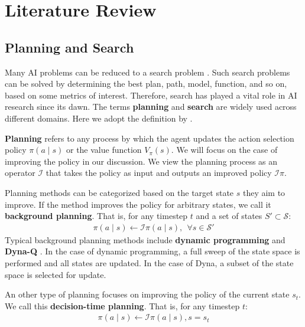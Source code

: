 \chapter{Literature Review} \label{sec:literature}

\section{Planning and Search}
Many AI problems can be reduced to a search problem \cite[p.39]{ArtificialIntelligenceGames_Yannakakis.Togelius_2018}.
Such search problems can be solved by determining the best plan, path, model, function, and so on, based on some metrics of interest.
Therefore, search has played a vital role in AI research since its dawn. The terms \textbf{planning} and \textbf{search} are widely used across different domains.
Here we adopt the definition by \citeauthor{ReinforcementLearningIntroduction_Sutton.Barto_2018} \cite{ReinforcementLearningIntroduction_Sutton.Barto_2018}.

\textbf{Planning} refers to any process by which the agent updates the action selection policy $\pi(a \mid s)$ or the value function $V_\pi(s)$.
We will focus on the case of improving the policy in our discussion.
We view the planning process as an operator $\mathcal{I}$ that takes the policy as input and outputs an improved policy $\mathcal{I}\pi$.

Planning methods can be categorized based on the target state $s$ they aim to improve.
If the method improves the policy for arbitrary states, we call it \textbf{background planning}.
That is, for any timestep $t$ and a set of states $S' \subset \mathcal{S}$:
\begin{align*}
    \pi(a \mid s) \leftarrow \mathcal{I}\pi(a \mid s), ~~ \forall s \in \mathcal{S'}
\end{align*}
Typical background planning methods include \textbf{dynamic programming} and \textbf{Dyna-Q} \cite{ReinforcementLearningIntroduction_Sutton.Barto_2018}.
In the case of dynamic programming, a full sweep of the state space is performed and all states are updated.
In the case of Dyna, a subset of the state space is selected for update.

An other type of planning focuses on improving the policy of the current state $s_t$.
We call this \textbf{decision-time planning}.
That is, for any timestep $t$:
\begin{align*}
    \pi(a \mid s) \leftarrow \mathcal{I}\pi(a \mid s), s = s_t
\end{align*}

